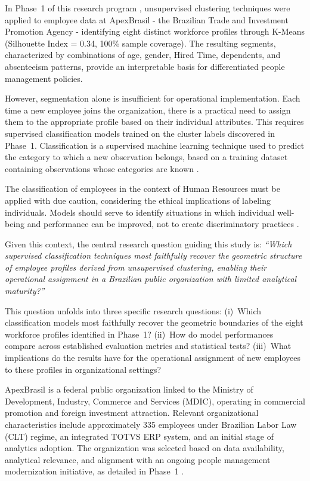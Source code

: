\documentclass[alpha-refs,english]{RBCA_v3.0}
\begin{document}
In Phase~1 of this research program \citep{Moreira2026}, unsupervised clustering techniques were applied to employee data at ApexBrasil - the Brazilian Trade and Investment Promotion Agency - identifying eight distinct workforce profiles through K-Means (Silhouette Index = 0.34, 100\% sample coverage). The resulting segments, characterized by combinations of age, gender, Hired Time, dependents, and absenteeism patterns, provide an interpretable basis for differentiated people management policies.

However, segmentation alone is insufficient for operational implementation. Each time a new employee joins the organization, there is a practical need to assign them to the appropriate profile based on their individual attributes. This requires supervised classification models trained on the cluster labels discovered in Phase~1. Classification is a supervised machine learning technique used to predict the category to which a new observation belongs, based on a training dataset containing observations whose categories are known \citep{Han2012}.

The classification of employees in the context of Human Resources must be applied with due caution, considering the ethical implications of labeling individuals. Models should serve to identify situations in which individual well-being and performance can be improved, not to create discriminatory practices \citep{Tursunbayeva2022}.

Given this context, the central research question guiding this study is: \textit{``Which supervised classification techniques most faithfully recover the geometric structure of employee profiles derived from unsupervised clustering, enabling their operational assignment in a Brazilian public organization with limited analytical maturity?''}

This question unfolds into three specific research questions: (i)~Which classification models most faithfully recover the geometric boundaries of the eight workforce profiles identified in Phase~1? (ii)~How do model performances compare across established evaluation metrics and statistical tests? (iii)~What implications do the results have for the operational assignment of new employees to these profiles in organizational settings?

ApexBrasil is a federal public organization linked to the Ministry of Development, Industry, Commerce and Services (MDIC), operating in commercial promotion and foreign investment attraction. Relevant organizational characteristics include approximately 335 employees under Brazilian Labor Law (CLT) regime, an integrated TOTVS ERP system, and an initial stage of analytics adoption. The organization was selected based on data availability, analytical relevance, and alignment with an ongoing people management modernization initiative, as detailed in Phase~1 \citep{Moreira2026}.
\end{document}
